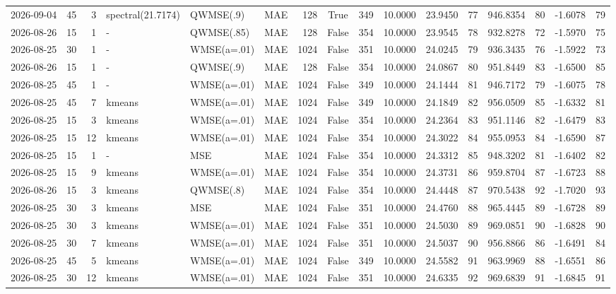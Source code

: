 \documentclass[10pt]{article}
\begin{document}
\begin{landscape}
\begin{longtable}{@{}lrrlllrcrrrrrrrr@{}}
2026-09-04 & 45 & 3 & spectral(21.7174) & QWMSE(.9) & MAE & 128 & True & 349 & 10.0000 & 23.9450 & 77 & 946.8354 & 80 & -1.6078 & 79 \\
2026-08-26 & 15 & 1 & - & QWMSE(.85) & MAE & 128 & False & 354 & 10.0000 & 23.9545 & 78 & 932.8278 & 72 & -1.5970 & 75 \\
2026-08-25 & 30 & 1 & - & WMSE(a=.01) & MAE & 1024 & False & 351 & 10.0000 & 24.0245 & 79 & 936.3435 & 76 & -1.5922 & 73 \\
2026-08-26 & 15 & 1 & - & QWMSE(.9) & MAE & 128 & False & 354 & 10.0000 & 24.0867 & 80 & 951.8449 & 83 & -1.6500 & 85 \\
2026-08-25 & 45 & 1 & - & WMSE(a=.01) & MAE & 1024 & False & 349 & 10.0000 & 24.1444 & 81 & 946.7172 & 79 & -1.6075 & 78 \\
2026-08-25 & 45 & 7 & kmeans & WMSE(a=.01) & MAE & 1024 & False & 349 & 10.0000 & 24.1849 & 82 & 956.0509 & 85 & -1.6332 & 81 \\
2026-08-25 & 15 & 3 & kmeans & WMSE(a=.01) & MAE & 1024 & False & 354 & 10.0000 & 24.2364 & 83 & 951.1146 & 82 & -1.6479 & 83 \\
2026-08-25 & 15 & 12 & kmeans & WMSE(a=.01) & MAE & 1024 & False & 354 & 10.0000 & 24.3022 & 84 & 955.0953 & 84 & -1.6590 & 87 \\
2026-08-25 & 15 & 1 & - & MSE & MAE & 1024 & False & 354 & 10.0000 & 24.3312 & 85 & 948.3202 & 81 & -1.6402 & 82 \\
2026-08-25 & 15 & 9 & kmeans & WMSE(a=.01) & MAE & 1024 & False & 354 & 10.0000 & 24.3731 & 86 & 959.8704 & 87 & -1.6723 & 88 \\
2026-08-26 & 15 & 3 & kmeans & QWMSE(.8) & MAE & 1024 & False & 354 & 10.0000 & 24.4448 & 87 & 970.5438 & 92 & -1.7020 & 93 \\
2026-08-25 & 30 & 3 & kmeans & MSE & MAE & 1024 & False & 351 & 10.0000 & 24.4760 & 88 & 965.4445 & 89 & -1.6728 & 89 \\
2026-08-25 & 30 & 3 & kmeans & WMSE(a=.01) & MAE & 1024 & False & 351 & 10.0000 & 24.5030 & 89 & 969.0851 & 90 & -1.6828 & 90 \\
2026-08-25 & 30 & 7 & kmeans & WMSE(a=.01) & MAE & 1024 & False & 351 & 10.0000 & 24.5037 & 90 & 956.8866 & 86 & -1.6491 & 84 \\
2026-08-25 & 45 & 5 & kmeans & WMSE(a=.01) & MAE & 1024 & False & 349 & 10.0000 & 24.5582 & 91 & 963.9969 & 88 & -1.6551 & 86 \\
2026-08-25 & 30 & 12 & kmeans & WMSE(a=.01) & MAE & 1024 & False & 351 & 10.0000 & 24.6335 & 92 & 969.6839 & 91 & -1.6845 & 91 \\

\end{longtable}
\end{landscape}
\end{document}
